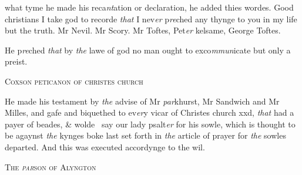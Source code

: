 \documentclass[12pt, a4paper]{book}
\begin{document}
 
 	
				\marginpar[\vspace{0.5cm}{\textcolor{Gray}{n}}]{}
			
 	
		\ifthenelse{\isodd{\thepage}}
		{\reversemarginpar}
		{\normalmarginpar}
		what tyme he made his reca\textit{nt}ation or declaration, he
 added thies wordes. Good christians I take god to recorde
 \textit{that} I nev\textit{er} p\textit{re}ched any thynge to you in my life but the
 		truth. Mr Nevil. Mr Scory. Mr Toftes, Pet\textit{er }kelsame,
 George Toftes.
 	
		\ifthenelse{\isodd{\thepage}}
		{\reversemarginpar}
		{\normalmarginpar}
		He p\textit{re}ched \textit{that} by \textit{the} lawe of god no man ought to exco\textit{mmun}icate
 		but only a preist.
 

            
            	
				\begin{center} \begin{large} {\scshape Coxson peticanon of christes church} \end{large} \end{center}
			

            	
            		
				\marginpar[\vspace{0.5cm}{\textcolor{Gray}{+}}]{}
			
            		
				\marginpar[\vspace{0.5cm}{\textcolor{Gray}{n}}]{}
			
            		
		\ifthenelse{\isodd{\thepage}}
		{\reversemarginpar}
		{\normalmarginpar}
		He made his testament by \textit{the} advise of Mr \textit{par}khurst, Mr
            			Sandwich and Mr Milles, and gafe and biquethed to ev\textit{er}y vicar
 of Christes church xxd, \textit{that} had a payer of beades, \& wolde 
say our lady psalt\textit{er} for his sowle, which is thought
 to be agaynst \textit{the} kynges boke last set forth in \textit{the} article
 of prayer for \textit{the} sowles departed. And this was executed accordynge to the wil.
 

            
               
				\begin{center} \begin{large} {\scshape The \textit{par}son of Alyngton} \end{large} \end{center}
			
               
               	
			
\end{document}
